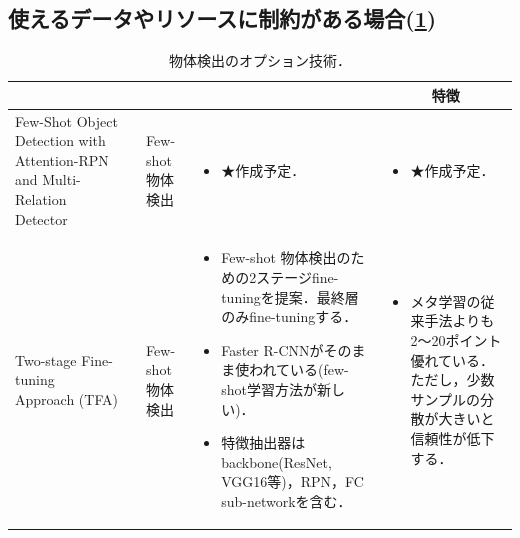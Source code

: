 \documentclass[originalpaper]{jsaiart}     %
\begin{document}
\subsection{使えるデータやリソースに制約がある場合(\ref{tbl-select-sub})}
\begin{table}
    \caption{物体検出のオプション技術．}
    \label{tbl-select-sub}
    \begin{center}
        \setlength{\tabcolsep}{3pt}
        \footnotesize
        \begin{tabularx}{\linewidth}{Xp{1.5cm}Xp{7cm}X} \toprule
            \centering{モデル名称} & \centering{文献} & \centering{用途} & \centering{概要} & \multicolumn{1}{c}{特徴} \\ \midrule

            Few-Shot Object Detection with Attention-RPN and Multi-Relation Detector &  & Few-shot 物体検出 & 
            \begin{itemize}
                \vspace{-0.7\baselineskip}
                \setlength{\leftskip}{-3mm}
                \item ★作成予定．
            \end{itemize}
            &
            \begin{itemize}
                \vspace{-0.7\baselineskip}
                \setlength{\leftskip}{-3mm}
                \item ★作成予定．
            \end{itemize}
            \\

            Two-stage Fine-tuning Approach (TFA) & \cite{WHGDY20} & Few-shot 物体検出 & 
            \begin{itemize}
                \vspace{-0.7\baselineskip}
                \setlength{\leftskip}{-3mm}
                \item Few-shot 物体検出のための2ステージfine-tuningを提案．最終層のみfine-tuningする．
                \item Faster R-CNNがそのまま使われている(few-shot学習方法が新しい)．
                \item 特徴抽出器は backbone(ResNet, VGG16等)，RPN，FC sub-networkを含む．
            \end{itemize}
            &
            \begin{itemize}
                \vspace{-0.7\baselineskip}
                \setlength{\leftskip}{-3mm}
                \item メタ学習の従来手法よりも2〜20ポイント優れている．ただし，少数サンプルの分散が大きいと信頼性が低下する．
            \end{itemize}
            \\


\end{tabularx}
\end{center}
\end{table}
\end{document}
